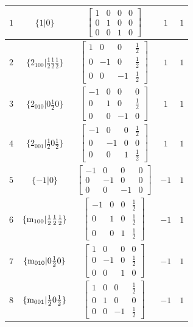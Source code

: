 \documentclass[fleqn,8pt]{jsarticle}
\begin{document}
\begin{longtable}{ccccc}
$ 1 $ & $ \{1|0\} $ & $ \begin{bmatrix} 1 & 0 & 0 & 0 \\ 0 & 1 & 0 & 0 \\ 0 & 0 & 1 & 0 \end{bmatrix} $ & $ 1 $ & $ 1 $ \\ \hline
$ 2 $ & $ \{2{}_{100}|\frac{1}{2} \frac{1}{2} \frac{1}{2}\} $ & $ \begin{bmatrix} 1 & 0 & 0 & \frac{1}{2} \\ 0 & -1 & 0 & \frac{1}{2} \\ 0 & 0 & -1 & \frac{1}{2} \end{bmatrix} $ & $ 1 $ & $ 1 $ \\ \hline
$ 3 $ & $ \{2{}_{010}|0 \frac{1}{2} 0\} $ & $ \begin{bmatrix} -1 & 0 & 0 & 0 \\ 0 & 1 & 0 & \frac{1}{2} \\ 0 & 0 & -1 & 0 \end{bmatrix} $ & $ 1 $ & $ 1 $ \\ \hline
$ 4 $ & $ \{2{}_{001}|\frac{1}{2} 0 \frac{1}{2}\} $ & $ \begin{bmatrix} -1 & 0 & 0 & \frac{1}{2} \\ 0 & -1 & 0 & 0 \\ 0 & 0 & 1 & \frac{1}{2} \end{bmatrix} $ & $ 1 $ & $ 1 $ \\ \hline
$ 5 $ & $ \{-1|0\} $ & $ \begin{bmatrix} -1 & 0 & 0 & 0 \\ 0 & -1 & 0 & 0 \\ 0 & 0 & -1 & 0 \end{bmatrix} $ & $ -1 $ & $ 1 $ \\ \hline
$ 6 $ & $ \{{\rm m}_{100}|\frac{1}{2} \frac{1}{2} \frac{1}{2}\} $ & $ \begin{bmatrix} -1 & 0 & 0 & \frac{1}{2} \\ 0 & 1 & 0 & \frac{1}{2} \\ 0 & 0 & 1 & \frac{1}{2} \end{bmatrix} $ & $ -1 $ & $ 1 $ \\ \hline
$ 7 $ & $ \{{\rm m}_{010}|0 \frac{1}{2} 0\} $ & $ \begin{bmatrix} 1 & 0 & 0 & 0 \\ 0 & -1 & 0 & \frac{1}{2} \\ 0 & 0 & 1 & 0 \end{bmatrix} $ & $ -1 $ & $ 1 $ \\ \hline
$ 8 $ & $ \{{\rm m}_{001}|\frac{1}{2} 0 \frac{1}{2}\} $ & $ \begin{bmatrix} 1 & 0 & 0 & \frac{1}{2} \\ 0 & 1 & 0 & 0 \\ 0 & 0 & -1 & \frac{1}{2} \end{bmatrix} $ & $ -1 $ & $ 1 $ \\ \hline

\end{longtable}
\end{document}
